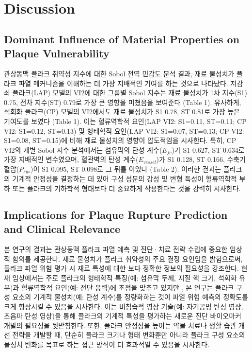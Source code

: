 \documentclass[preprint,12pt]{elsarticle}
\begin{document}
\section{Discussion}

\subsection{Dominant Influence of Material Properties on Plaque Vulnerability}
관상동맥 플라크 취약성 지수에 대한 Sobol 전역 민감도 분석 결과, 재료 물성치가 플라크 파열 메커니즘을 이해하는 데 가장 지배적인 기여를 하는 것으로 나타났다. 저감쇠 플라크(LAP) 모델의 VI2에 대한 그룹별 Sobol 지수는 재료 물성치가 1차 지수(S1) 0.75, 전차 지수(ST) 0.79로 가장 큰 영향을 미쳤음을 보여준다 (Table 1). 유사하게, 석회화 플라크(CP) 모델의 VI2에서도 재료 물성치가 S1 0.78, ST 0.81로 가장 높은 기여도를 보였다 (Table 1). 이는 혈류역학적 요인(LAP VI2: S1=0.11, ST=0.11; CP VI2: S1=0.12, ST=0.13) 및 형태학적 요인(LAP VI2: S1=0.07, ST=0.13; CP VI2: S1=0.08, ST=0.15)에 비해 재료 물성치의 영향이 압도적임을 시사한다. 특히, CP VI2의 개별 Sobol 지수 분석에서는 섬유막의 탄성 계수($E_{fc}$)가 S1 0.627, ST 0.634로 가장 지배적인 변수였으며, 혈관벽의 탄성 계수($E_{vessel}$)가 S1 0.128, ST 0.166, 수축기 혈압($P_{sys}$)이 S1 0.095, ST 0.098로 그 뒤를 이었다 (Table 2). 이러한 결과는 플라크의 기계적 안정성을 결정하는 데 있어 구성 성분의 강성 및 변형 특성이 혈류역학적 부하 또는 플라크의 기하학적 형태보다 더 중요하게 작용한다는 것을 강력히 시사한다.

\subsection{Implications for Plaque Rupture Prediction and Clinical Relevance}
본 연구의 결과는 관상동맥 플라크 파열 예측 및 진단·치료 전략 수립에 중요한 임상적 함의를 제공한다. 재료 물성치가 플라크 취약성의 주요 결정 요인임을 밝힘으로써, 플라크 파열 위험 평가 시 재료 특성에 대한 보다 정확한 정보의 필요성을 강조한다. 현재 임상에서는 주로 플라크의 형태학적 특징(예: 섬유막 두께, 지질 핵 크기, 석회화 유무)과 혈류역학적 요인(예: 전단 응력)에 초점을 맞추고 있지만 \cite{motoyama2009} \cite{naghavi2003} \cite{virmani2005}, 본 연구는 플라크 구성 요소의 기계적 물성치(예: 탄성 계수)를 정량화하는 것이 파열 위험 예측의 정확도를 크게 향상시킬 수 있음을 시사한다. 이는 비침습적 영상 기술(예: 자기공명 탄성 영상, 초음파 탄성 영상)을 통해 플라크의 기계적 특성을 평가하는 새로운 진단 바이오마커 개발의 필요성을 뒷받침한다. 또한, 플라크 안정성을 높이는 약물 치료나 생활 습관 개선 전략을 개발할 때, 단순히 플라크 크기나 형태 변화뿐만 아니라 플라크 구성 요소의 물성치 변화를 목표로 하는 접근 방식이 더 효과적일 수 있음을 시사한다.
\end{document}

